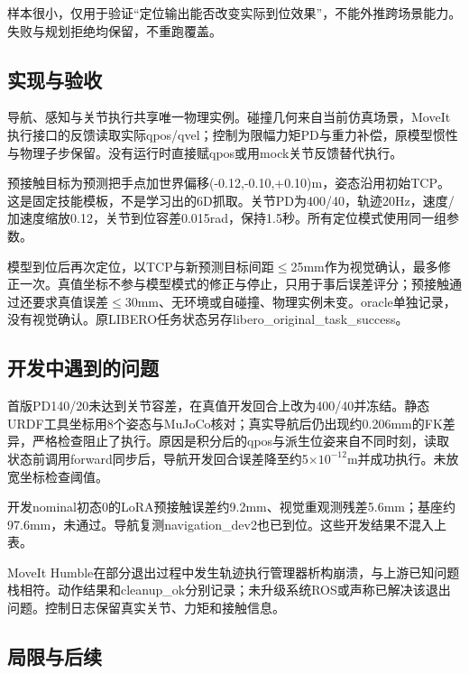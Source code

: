 样本很小，仅用于验证``定位输出能否改变实际到位效果''，不能外推跨场景能力。失败与规划拒绝均保留，不重跑覆盖。


\subsection{实现与验收}\label{s19-detail-2}

导航、感知与关节执行共享唯一物理实例。碰撞几何来自当前仿真场景，MoveIt执行接口的反馈读取实际qpos/qvel；控制为限幅力矩PD与重力补偿，原模型惯性与物理子步保留。没有运行时直接赋qpos或用mock关节反馈替代执行。

预接触目标为预测把手点加世界偏移(-0.12,-0.10,+0.10)m，姿态沿用初始TCP。这是固定技能模板，不是学习出的6D抓取。关节PD为400/40，轨迹20Hz，速度/加速度缩放0.12，关节到位容差0.015rad，保持1.5秒。所有定位模式使用同一组参数。

模型到位后再次定位，以TCP与新预测目标间距\(\leq\)25mm作为视觉确认，最多修正一次。真值坐标不参与模型模式的修正与停止，只用于事后误差评分；预接触通过还要求真值误差\(\leq\)30mm、无环境或自碰撞、物理实例未变。oracle单独记录，没有视觉确认。原LIBERO任务状态另存libero\_original\_task\_success。

\subsection{开发中遇到的问题}\label{s19-detail-3}

首版PD140/20未达到关节容差，在真值开发回合上改为400/40并冻结。静态URDF工具坐标用8个姿态与MuJoCo核对；真实导航后仍出现约0.206mm的FK差异，严格检查阻止了执行。原因是积分后的qpos与派生位姿来自不同时刻，读取状态前调用forward同步后，导航开发回合误差降至约5\(\times\)\(10^{-12}\)m并成功执行。未放宽坐标检查阈值。

开发nominal初态0的LoRA预接触误差约9.2mm、视觉重观测残差5.6mm；基座约97.6mm，未通过。导航复测navigation\_dev2也已到位。这些开发结果不混入上表。

MoveIt Humble在部分退出过程中发生轨迹执行管理器析构崩溃，与上游已知问题栈相符。动作结果和cleanup\_ok分别记录；未升级系统ROS或声称已解决该退出问题。控制日志保留真实关节、力矩和接触信息。

\subsection{局限与后续}\label{s19-detail-4}

